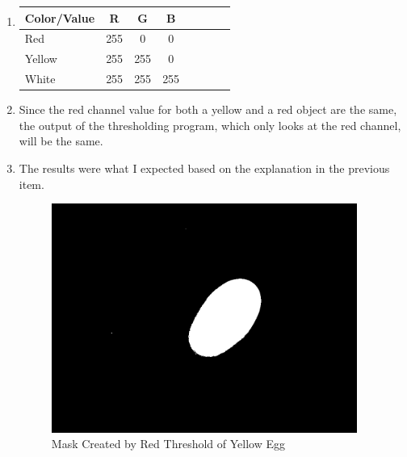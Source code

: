 \documentclass{article}
\begin{document}
\begin{enumerate}

\item
\begin{tabular}{l*{6}{c}r}
Color/Value              & R & G & B \\
\hline
Red & 255 & 0 & 0   \\
Yellow            & 255 & 255 & 0   \\
White           & 255 & 255 & 255  \\
\end{tabular}

\item
Since the red channel value for both a yellow and a red object are the same, the output of the thresholding program, which only looks at the red channel, will be the same.

\item
The results were what I expected based on the explanation in the previous item.
\begin{figure}[ht!]
\centering
\includegraphics[width=100mm]{yellowEggThresholded175.png}
\caption{Mask Created by Red Threshold of Yellow Egg}
\label{overflow}
\end{figure}



\end{enumerate}
\end{document}
